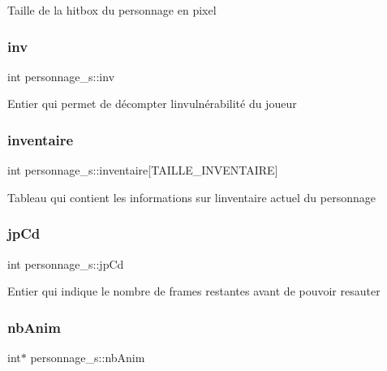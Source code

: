 Taille de la hitbox du personnage en pixel \mbox{\label{structpersonnage__s_a1d76a383232b764037a80a8b39b3c378}} 
\subsubsection{\texorpdfstring{inv}{inv}}
{\footnotesize\ttfamily int personnage\+\_\+s\+::inv}

Entier qui permet de décompter l\textquotesingle{}invulnérabilité du joueur \mbox{\label{structpersonnage__s_a0aefe070eb6c9c73fe6a40c909d2dc30}} 
\subsubsection{\texorpdfstring{inventaire}{inventaire}}
{\footnotesize\ttfamily int personnage\+\_\+s\+::inventaire\mbox{[}T\+A\+I\+L\+L\+E\+\_\+\+I\+N\+V\+E\+N\+T\+A\+I\+RE\mbox{]}}

Tableau qui contient les informations sur l\textquotesingle{}inventaire actuel du personnage \mbox{\label{structpersonnage__s_a05d061a818efa6b7bfa5b3c76ba3b8dd}} 
\subsubsection{\texorpdfstring{jp\+Cd}{jpCd}}
{\footnotesize\ttfamily int personnage\+\_\+s\+::jp\+Cd}

Entier qui indique le nombre de frames restantes avant de pouvoir resauter \mbox{\label{structpersonnage__s_a05aa3037a7469f58464094d2bd2d683a}} 
\subsubsection{\texorpdfstring{nb\+Anim}{nbAnim}}
{\footnotesize\ttfamily int$\ast$ personnage\+\_\+s\+::nb\+Anim}

